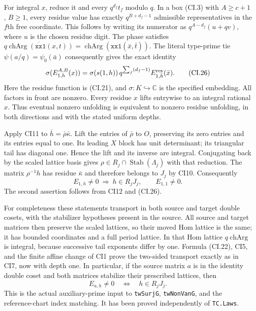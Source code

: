 For integral $x$, reduce it and every $q^{d_f}t_f$ modulo $q$.
In a box (CI.3) with $A\ge c+1$, $B\ge1$, every residue value
has exactly $q^{B+d_f-1}$ admissible representatives in the
$f$th free coordinate. This follows by writing its numerator
as $q^{A-d_f}(u+qv)$, where $u$ is the chosen residue digit.
The phase satisfies
$\overline{q\operatorname{chArg}(\texttt{xx1}(x,t))}
=\operatorname{chArg}(\texttt{xx1}(\bar x,\bar t))$.
The literal type-prime tie
$\psi(a/q)=\psi_0(\bar a)$ consequently gives the exact identity
\[
 \sigma(E^{A,B}_{1,h}(x))
   =\sigma(s(1,h))\,
        q^{\sum_f(d_f-1)} E^{\rm res}_{1,\bar h}(\bar x).
 \tag{CI.26}
\]
Here the residue function is (CI.21), and $\sigma:K\hookrightarrow
\mathbb C$ is the specified embedding. All factors in front are
nonzero. Every residue $x$ lifts entrywise to an integral rational
$x$. Thus eventual nonzero unfolding is equivalent to nonzero
residue unfolding, in both directions and with the stated
uniform depths.

Apply CI11 to $\bar h=\bar\rho\bar\kappa$. Lift the entries of
$\bar\rho$ to $O$, preserving its zero entries and its entries
equal to one. Its leading $X$ block has unit determinant; its
triangular tail has diagonal one. Hence the lift and its inverse
are integral. Conjugating back by the scaled lattice basis gives
$\rho\in R_j\cap\operatorname{Stab}(\Lambda_j)$ with that
reduction. The matrix $\rho^{-1}h$ has residue $\bar\kappa$ and
therefore belongs to $J_j$ by CI10. Consequently
\[
 E_{1,h}\ne0\ \Longrightarrow\ h\in R_jJ_j,
 \qquad E_{1,1}\ne0.
 \tag{CI.27}
\]
The second assertion follows from CI12 and (CI.26).

For completeness these statements transport in both source and
target double cosets, with the stabilizer hypotheses present
in the source. All source and target matrices then preserve the
scaled lattices, so their moved Hom lattice is the same; it has
bounded coordinates and a full period lattice. In that Hom
lattice $q\operatorname{chArg}$ is integral, because successive
tail exponents differ by one. Formula (CI.22), CI5, and the finite
affine change of CI1 prove the two-sided transport exactly as in
CI7, now with depth one. In particular, if the source matrix
$a$ is in the identity double coset and both matrices stabilize
their prescribed lattices, then
\[
 E_{a,h}\ne0\quad\Longleftrightarrow\quad h\in R_jJ_j.
 \tag{CI.28}
\]
This is the actual auxiliary-prime input to \texttt{twSurjG},
\texttt{twNonVanG}, and the reference-chart index matching.
It has been proved independently of \texttt{TC.Laws}.

